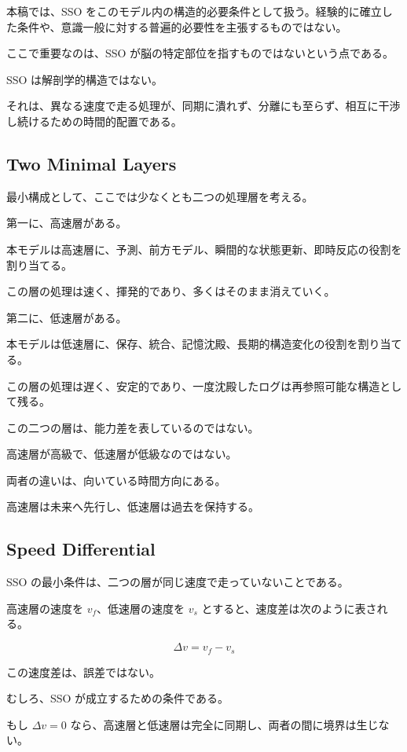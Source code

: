 本稿では、SSO をこのモデル内の構造的必要条件として扱う。経験的に確立した条件や、意識一般に対する普遍的必要性を主張するものではない。

ここで重要なのは、SSO が脳の特定部位を指すものではないという点である。

SSO は解剖学的構造ではない。

それは、異なる速度で走る処理が、同期に潰れず、分離にも至らず、相互に干渉し続けるための時間的配置である。

\subsection{Two Minimal Layers}

最小構成として、ここでは少なくとも二つの処理層を考える。

第一に、高速層がある。

本モデルは高速層に、予測、前方モデル、瞬間的な状態更新、即時反応の役割を割り当てる。

この層の処理は速く、揮発的であり、多くはそのまま消えていく。

第二に、低速層がある。

本モデルは低速層に、保存、統合、記憶沈殿、長期的構造変化の役割を割り当てる。

この層の処理は遅く、安定的であり、一度沈殿したログは再参照可能な構造として残る。

この二つの層は、能力差を表しているのではない。

高速層が高級で、低速層が低級なのではない。

両者の違いは、向いている時間方向にある。

高速層は未来へ先行し、低速層は過去を保持する。

\subsection{Speed Differential}

SSO の最小条件は、二つの層が同じ速度で走っていないことである。

高速層の速度を $v_f$、低速層の速度を $v_s$ とすると、速度差は次のように表される。

\begin{equation}
\Delta v = v_f - v_s
\end{equation}

この速度差は、誤差ではない。

むしろ、SSO が成立するための条件である。

もし $\Delta v = 0$ なら、高速層と低速層は完全に同期し、両者の間に境界は生じない。

